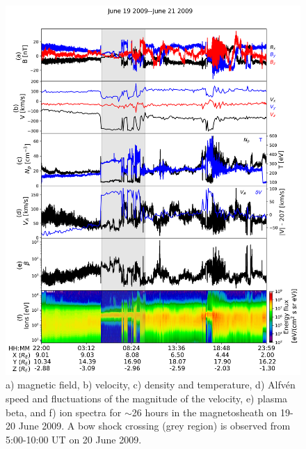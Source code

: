 \begin{figure}
    \centering
    \includegraphics[width=\textwidth]{Figures/Time series/timeseries_19062009_THMC.png}
    \caption[Time series data for THM-C on 19-20 June 2009]{a) magnetic field, b) velocity, c) density and temperature, d) Alfv\'en speed and fluctuations of the magnitude of the velocity, e) plasma beta, and f) ion spectra for $\sim$26 hours in the magnetosheath on 19-20 June 2009. A bow shock crossing (grey region) is observed from 5:00-10:00 UT on 20 June 2009.}
    \label{fig:timeseries-THM-magnetosheath}
\end{figure}

